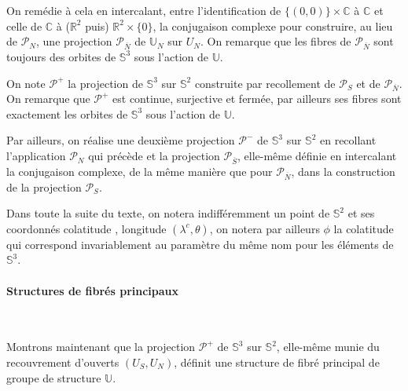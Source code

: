 \par
On rem\'edie \`a cela en intercalant, entre l'identification de $\{(0,0)\}\times\mathbb{C}$ \`a $\mathbb{C}$ et celle de $\mathbb{C}$ \`a ($\mathbb{R}^2$ puis) $\mathbb{R}^2\times\{0\}$, %
la conjugaison complexe pour construire, au lieu de $\mathcal{P}_N$, une projection $\mathcal{P}_{\overline{N}}$ de $\mathbb{U}_N$ sur $U_N$. %
On remarque que les fibres de $\mathcal{P}_{\overline{N}}$ sont toujours des orbites de $\mathbb{S}^3$ sous l'action de $\mathbb{U}$.

\ligneinter
On note $\mathcal{P}^+$ la projection de $\mathbb{S}^3$ sur $\mathbb{S}^2$ construite par recollement de $\mathcal{P}_S$ et de $\mathcal{P}_{\overline{N}}$. %
On remarque que $\mathcal{P}^+$ est continue, surjective et ferm\'ee, par ailleurs ses fibres sont exactement les orbites de $\mathbb{S}^3$ sous l'action de $\mathbb{U}$.

\ligneinter
Par ailleurs, on r\'ealise une deuxi\`eme projection $\mathcal{P}^-$ de $\mathbb{S}^3$ sur $\mathbb{S}^2$ en recollant l'application $\mathcal{P}_N$ qui pr\'ec\`ede %
et la projection $\mathcal{P}_{\overline{S}}$, elle-m\^eme d\'efinie en intercalant la conjugaison complexe, %
de la m\^eme mani\`ere que pour $\mathcal{P}_{\overline{N}}$, dans la construction de la projection $\mathcal{P}_S$.

\etoile
Dans toute la suite du texte, on notera indiff\'eremment un point de $\mathbb{S}^2$ et ses coordonn\'es \og{}colatitude , longitude\fg{} $(\lambda^c,\theta)$, %
on notera par ailleurs $\phi$ la colatitude qui correspond invariablement au param\`etre du m\^eme nom pour les \'el\'ements de $\mathbb{S}^3$.

\par
\paragraph{Structures de fibr\'es principaux}\label{fis}~\\

\par
Montrons maintenant que la projection $\mathcal{P}^+$ de $\mathbb{S}^3$ sur $\mathbb{S}^2$, elle-m\^eme munie du recouvrement d'ouverts $(U_S,U_N)$, %
d\'efinit une structure de fibr\'e principal de groupe de structure $\mathbb{U}$.

